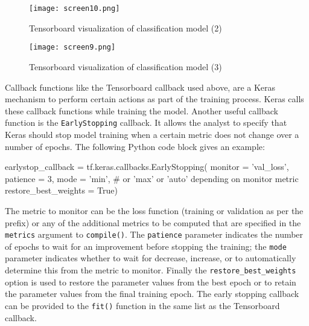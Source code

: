 \begin{figure}
\centering
\texttt{[image: screen10.png]} 
\caption{Tensorboard visualization of classification model (2)}
\label{fig:screen10_chap15}
\end{figure}

\begin{figure}
\centering
\texttt{[image: screen9.png]}
\caption{Tensorboard visualization of classification model (3)}
\label{fig:screen9_chap15}
\end{figure}

Callback functions like the Tensorboard callback used above, are a Keras mechanism to perform certain actions as part of the training process. Keras calls these callback functions while training the model. Another useful callback function is the \texttt{EarlyStopping} callback. It allows the analyst to specify that Keras should stop model training when a certain metric does not change over a number of epochs. The following Python code block gives an example:

\begin{samepage}
\begin{pythoncode}
earlystop_callback = tf.keras.callbacks.EarlyStopping(
    monitor = 'val_loss',
    patience = 3,
    mode = 'min', # or 'max' or 'auto' depending on monitor metric
    restore_best_weights = True)
\end{pythoncode}
\end{samepage}

The metric to monitor can be the loss function (training or validation as per the prefix) or any of the additional metrics to be computed that are specified in the \texttt{metrics} argument to \texttt{compile()}. The \texttt{patience} parameter indicates the number of epochs to wait for an improvement before stopping the training; the \texttt{mode} parameter indicates whether to wait for decrease, increase, or to automatically determine this from the metric to monitor. Finally the \texttt{restore\_best\_weights} option is used to restore the parameter values from the best epoch or to retain the parameter values from the final training epoch. The early stopping callback can be provided to the \texttt{fit()} function in the same list as the Tensorboard callback.

